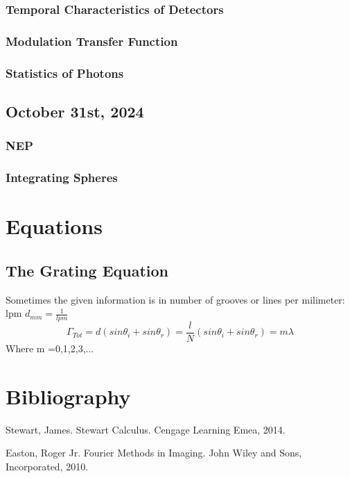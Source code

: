 \documentclass{article}
\begin{document}
\subsubsection{Temporal Characteristics 
 of Detectors}


 \subsubsection{Modulation Transfer Function}


 \subsubsection{Statistics of Photons}

 \subsection{October 31st, 2024}


 \subsubsection{NEP}


 \subsubsection{Integrating Spheres}

\section{Equations}




\subsection{The Grating Equation}
Sometimes the given information is in number of grooves or lines per milimeter: lpm 
$d_{mm} = \frac{1}{lpm}$
\begin{equation}
    \Gamma_{Tot}=d(sin \theta_{i} + sin \theta_{r}) = \frac{l}{N}(sin \theta_{i} + sin \theta_{r}) = m \lambda
\end{equation}
Where m =0,1,2,3,...


\clearpage
\section{Bibliography}
\begin{thebibliography}{}

Stewart, James. Stewart Calculus. Cengage Learning Emea, 2014.

Easton, Roger Jr. Fourier Methods in Imaging. John Wiley and Sons, Incorporated, 2010.


\end{thebibliography}
\end{document}
